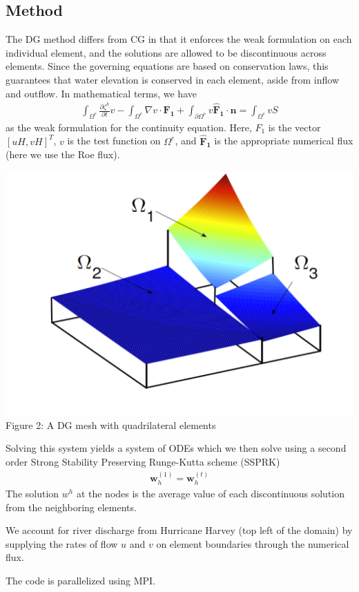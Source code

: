 \documentclass[american]{article}
\newcommand\pd[2]{\frac{\partial #1}{\partial #2}}
\newcommand\inte{\int_{\Omega^e}}
\newcommand\pinte{\int_{\partial\Omega^e}}
\newcommand\ve[1]{\mathbf{#1}}
\begin{document}
\begin{multicols}{3}
\section*{Method}
The DG method differs from CG in that it enforces the weak formulation on each individual element, and the solutions are allowed to be discontinuous across elements. Since the governing equations are based on conservation laws, this guarantees that water elevation is conserved in each element, aside from inflow and outflow. In mathematical terms, we have
\begin{align*}
  \inte \pd{\zeta^h}{t} v - \inte \nabla v \cdot \ve{F_1} + \pinte v \ve{\widehat{F}_1} \cdot \ve{n}  = \inte v S
\end{align*}
as the weak formulation for the continuity equation. Here, $F_1$ is the vector $[uH, vH]^T$, $v$ is the test function on $\Omega^e$, and $\ve{\widehat{F}_1}$ is the appropriate numerical flux (here we use the Roe flux).
\begin{center}
  \vspace{5mm}
    \includegraphics[width=0.55 \linewidth]{media/dg.png} \\
    Figure 2: A DG mesh with quadrilateral elements
\end{center}

Solving this system yields a system of ODEs which we then solve using a second order Strong Stability Preserving Runge-Kutta scheme (SSPRK)
\begin{align*}
  \ve{w}_h^{(1)} = \ve{w}_h^{(t)}
\end{align*}
The solution $w^h$ at the nodes is the average value of each discontinuous solution from the neighboring elements.

We account for river discharge from Hurricane Harvey (top left of the domain) by supplying the rates of flow $u$ and $v$ on element boundaries through the numerical flux.

The code is parallelized using MPI.


\end{multicols}
\end{document}
